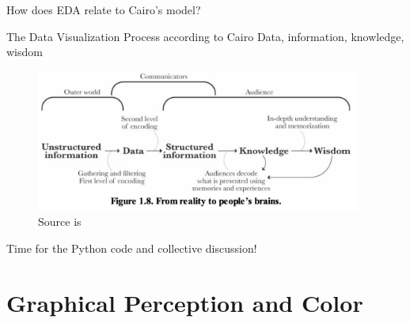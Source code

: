 \documentclass[notes, aspectratio=1610]{beamer}
\begin{document}
\begin{frame}{}{}
	\centering
	\Large How does EDA relate to Cairo's model?
\end{frame}
	

\begin{frame}{The Data Visualization Process according to Cairo}
	{Data, information, knowledge, wisdom}{}
	\begin{figure}
		\includegraphics[width=0.95\textwidth]{images/cairo_model.png}
		\caption*{Source is \cite[][page 29]{cairo2012}}
	\end{figure}
\end{frame}

\begin{frame}{}{}
\centering
\Large Time for the Python code and collective discussion!
\end{frame}

\section{Graphical Perception and Color}
\end{document}
